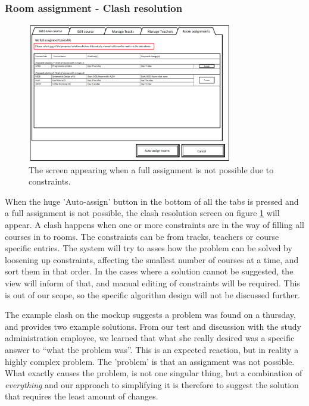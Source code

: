 \subsubsection{Room assignment - Clash resolution}
\begin{figure}[htb]
\begin{center}
\leavevmode
\includegraphics[width=0.8\textwidth]{images/courseplan2_Room_Assignments_clash}
\end{center}
\caption{The screen appearing when a full assignment is not possible due to constraints.}
\label{fig:courseplan2_clash}
\end{figure}
When the huge 'Auto-assign' button in the bottom of all the tabs is pressed and a full assignment is not possible, the clash resolution screen on figure \ref{fig:courseplan2_clash} will appear.
A clash happens when one or more constraints are in the way of filling all courses in to rooms. The constraints can be from tracks, teachers or course specific entries.
The system will try to asses how the problem can be solved by loosening up constraints, affecting the smallest number of courses at a time, and sort them in that order. In the cases where a solution cannot be suggested, the view will inform of that, and manual editing of constraints will be required. This is out of our scope, so the specific algorithm design will not be discussed further.

The example clash on the mockup suggests a problem was found on a thursday, and provides two example solutions. From our test and discussion with the study administration employee, we learned that what she really desired was a specific answer to ``what the problem was''. This is an expected reaction, but in reality a highly complex problem. The 'problem' is that an assignment was not possible. What exactly causes the problem, is not one singular thing, but a combination of \emph{everything} and our approach to simplifying it is therefore to suggest the solution that requires the least amount of changes.

